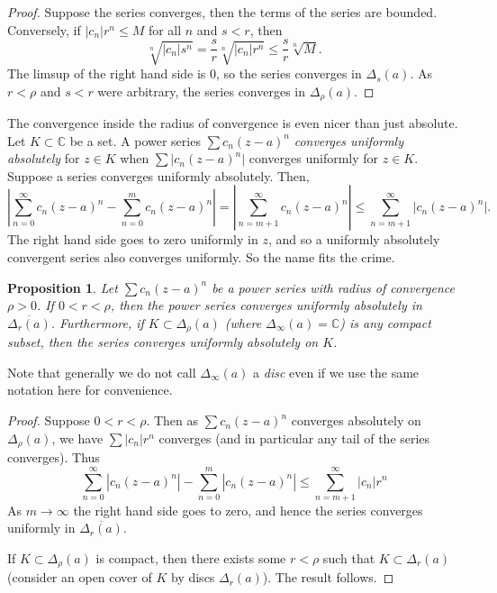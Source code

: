 \documentclass[12pt,openany]{book}
\newcommand{\sabs}[1]{\lvert {#1} \rvert}
\newcommand{\abs}[1]{\left\lvert {#1} \right\rvert}
\newcommand{\C}{{\mathbb{C}}}
\newcommand{\myindex}[1]{#1\index{#1}}
\theoremstyle{plain}
\newtheorem{prop}[thm]{Proposition}
\theoremstyle{remark}
\theoremstyle{definition}
\theoremstyle{exercise}
\theoremstyle{example}
\begin{document}
\begin{proof}
Suppose the series converges, then the terms of the series are bounded.
Conversely, if 
$\sabs{c_n} r^n \leq M$ for all $n$ and $s < r$, then
\begin{equation*}
\sqrt[n]{\sabs{c_n} s^n}=
\frac{s}{r}\sqrt[n]{\sabs{c_n} r^n} \leq \frac{s}{r} \sqrt[n]{M} .
\end{equation*}
The limsup of the right hand side is 0, so the series converges in
$\Delta_s(a)$.  As $r < \rho$ and $s < r$ were arbitrary,
the series converges in $\Delta_\rho(a)$.
\end{proof}

The convergence inside the radius of convergence is even nicer than just absolute.
Let $K \subset \C$ be a set.
A power series $\sum c_n {(z-a)}^n$
\emph{\myindex{converges uniformly absolutely}}
for $z \in K$ when $\sum \sabs{c_n {(z-a)}^n}$
converges uniformly for $z \in K$.
Suppose a series converges uniformly absolutely.  Then,
\begin{equation*}
\abs{
\sum_{n=0}^\infty c_n {(z-a)}^n
-
\sum_{n=0}^{m} c_n {(z-a)}^n
}
=
\abs{\sum_{n=m+1}^\infty c_n {(z-a)}^n} \leq
\sum_{n=m+1}^\infty \sabs{c_n {(z-a)}^n} .
\end{equation*}
The right hand side goes to zero uniformly in $z$,
and so
a uniformly absolutely convergent series also converges
uniformly.  So the name fits the crime.

\begin{prop}
Let $\sum c_n {(z-a)}^n$ be a power series with radius of convergence $\rho
> 0$.  If $0 < r < \rho$, then the power series converges uniformly absolutely
in $\overline{\Delta_r(a)}$.  Furthermore, if $K \subset \Delta_{\rho}(a)$
(where $\Delta_{\infty}(a) = \C$)
is any compact subset, then the series converges uniformly absolutely on
$K$.
\end{prop}

Note that generally we do not call $\Delta_{\infty}(a)$ a \emph{disc} even
if we use the same notation here for convenience.

\begin{proof}
Suppose $0 < r < \rho$.  Then as $\sum c_n {(z-a)}^n$ converges absolutely
on $\Delta_\rho(a)$, we have
$\sum \sabs{c_n} r^n$ converges (and in particular any tail of
the series converges).  Thus
\begin{equation*}
\sum_{n=0}^\infty \abs{c_n {(z-a)}^n}
-
\sum_{n=0}^{m} \abs{c_n {(z-a)}^n}
\leq
\sum_{n=m+1}^\infty \sabs{c_n} r^n
\end{equation*}
As $m \to \infty$ the right hand side goes to zero, and hence 
the series converges uniformly in $\overline{\Delta_r(a)}$.

If $K \subset \Delta_{\rho}(a)$ is compact, then there exists some $r <
\rho$ such that $K \subset \Delta_r(a)$ (consider an open cover of
$K$ by discs $\Delta_r(a)$).  The result follows.
\end{proof}
\end{document}
